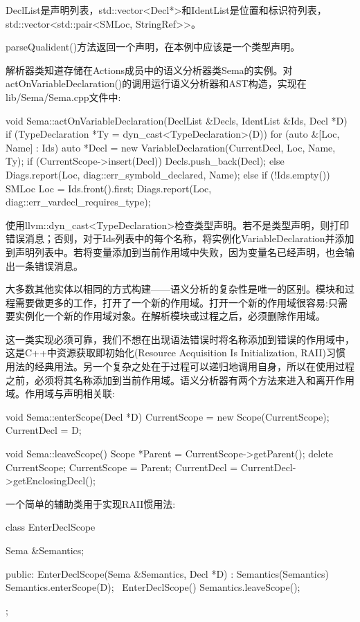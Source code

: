 DeclList是声明列表，std::vector<Decl*>和IdentList是位置和标识符列表，std::vector<std::pair<SMLoc, StringRef>{}>。

parseQualident()方法返回一个声明，在本例中应该是一个类型声明。

解析器类知道存储在Actions成员中的语义分析器类Sema的实例。对actOnVariableDeclaration()的调用运行语义分析器和AST构造，实现在lib/Sema/Sema.cpp文件中:

\begin{cpp}
void Sema::actOnVariableDeclaration(DeclList &Decls,
IdentList &Ids,
Decl *D) {
    if (TypeDeclaration *Ty = dyn_cast<TypeDeclaration>(D)) {
        for (auto &[Loc, Name] : Ids) {
            auto *Decl = new VariableDeclaration(CurrentDecl, Loc,
            Name, Ty);
            if (CurrentScope->insert(Decl))
                Decls.push_back(Decl);
            else
                Diags.report(Loc, diag::err_symbold_declared, Name);
        }
    } else if (!Ids.empty()) {
        SMLoc Loc = Ids.front().first;
        Diags.report(Loc, diag::err_vardecl_requires_type);
    }
}
\end{cpp}

使用llvm::dyn\_cast<TypeDeclaration>检查类型声明。若不是类型声明，则打印错误消息；否则，对于Ids列表中的每个名称，将实例化VariableDeclaration并添加到声明列表中。若将变量添加到当前作用域中失败，因为变量名已经声明，也会输出一条错误消息。

大多数其他实体以相同的方式构建——语义分析的复杂性是唯一的区别。模块和过程需要做更多的工作，打开了一个新的作用域。打开一个新的作用域很容易:只需要实例化一个新的作用域对象。在解析模块或过程之后，必须删除作用域。

这一类实现必须可靠，我们不想在出现语法错误时将名称添加到错误的作用域中，这是C++中资源获取即初始化(Resource Acquisition Is Initialization, RAII)习惯用法的经典用法。另一个复杂之处在于过程可以递归地调用自身，所以在使用过程之前，必须将其名称添加到当前作用域。语义分析器有两个方法来进入和离开作用域。作用域与声明相关联:

\begin{cpp}
void Sema::enterScope(Decl *D) {
    CurrentScope = new Scope(CurrentScope);
    CurrentDecl = D;
}

void Sema::leaveScope() {
    Scope *Parent = CurrentScope->getParent();
    delete CurrentScope;
    CurrentScope = Parent;
    CurrentDecl = CurrentDecl->getEnclosingDecl();
}
\end{cpp}

一个简单的辅助类用于实现RAII惯用法:

\begin{cpp}
class EnterDeclScope {
    Sema &Semantics;

public:
    EnterDeclScope(Sema &Semantics, Decl *D)
    : Semantics(Semantics) {
        Semantics.enterScope(D);
    }
    ~EnterDeclScope() { Semantics.leaveScope(); }
};
\end{cpp}

